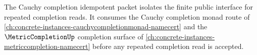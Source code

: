 The Cauchy completion idempotent packet isolates the finite public interface for
repeated completion reads.
It consumes the Cauchy completion monad route of \autoref{ch:concrete-instances-cauchycompletionmonad-namecert} and the $\MetricCompletionUp$ completion surface of \autoref{ch:concrete-instances-metriccompletion-namecert} before any repeated completion read is accepted.


